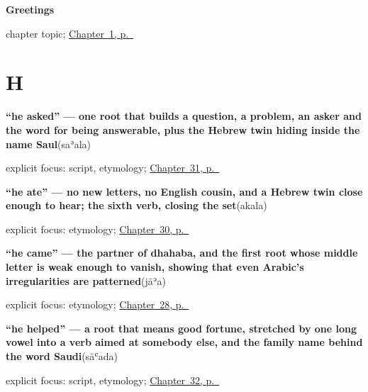 \noindent\begin{minipage}[t]{\linewidth}
\raggedright
\textbf{Greetings}\par
\footnotesize chapter topic; \hyperref[ch:greetings]{Chapter~1, p.~\pageref*{ch:greetings}}
\end{minipage}\par\smallskip

\section*{H}

\noindent\begin{minipage}[t]{\linewidth}
\raggedright
\textbf{\textquotedblleft{}he asked\textquotedblright{} — one root that builds a question, a problem, an asker and the word for being answerable, plus the Hebrew twin hiding inside the name Saul}\enspace\emph{}\enspace(saʾala)\par
\footnotesize explicit focus: script, etymology; \hyperref[ch:ar-understanding-reading-writing]{Chapter~31, p.~\pageref*{ch:ar-understanding-reading-writing}}
\end{minipage}\par\smallskip

\noindent\begin{minipage}[t]{\linewidth}
\raggedright
\textbf{\textquotedblleft{}he ate\textquotedblright{} — no new letters, no English cousin, and a Hebrew twin close enough to hear; the sixth verb, closing the set}\enspace\emph{}\enspace(akala)\par
\footnotesize explicit focus: etymology; \hyperref[ch:ar-knowing-and-eating]{Chapter~30, p.~\pageref*{ch:ar-knowing-and-eating}}
\end{minipage}\par\smallskip

\noindent\begin{minipage}[t]{\linewidth}
\raggedright
\textbf{\textquotedblleft{}he came\textquotedblright{} — the partner of dhahaba, and the first root whose middle letter is weak enough to vanish, showing that even Arabic's irregularities are patterned}\enspace\emph{}\enspace(jāʾa)\par
\footnotesize explicit focus: etymology; \hyperref[ch:ar-going-and-coming]{Chapter~28, p.~\pageref*{ch:ar-going-and-coming}}
\end{minipage}\par\smallskip

\noindent\begin{minipage}[t]{\linewidth}
\raggedright
\textbf{\textquotedblleft{}he helped\textquotedblright{} — a root that means good fortune, stretched by one long vowel into a verb aimed at somebody else, and the family name behind the word Saudi}\enspace\emph{}\enspace(sāʿada)\par
\footnotesize explicit focus: script, etymology; \hyperref[ch:ar-taking-thinking-helping-loving]{Chapter~32, p.~\pageref*{ch:ar-taking-thinking-helping-loving}}
\end{minipage}\par\smallskip

